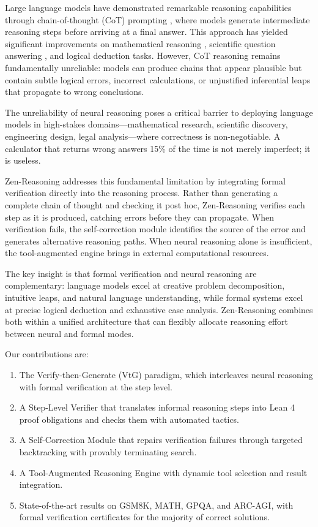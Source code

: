 \documentclass[11pt,a4paper]{article}
\begin{document}
Large language models have demonstrated remarkable reasoning capabilities through chain-of-thought (CoT) prompting \citep{wei2022chain}, where models generate intermediate reasoning steps before arriving at a final answer. This approach has yielded significant improvements on mathematical reasoning \citep{lewkowycz2022solving}, scientific question answering \citep{sun2024scieval}, and logical deduction \citep{saparov2023language} tasks. However, CoT reasoning remains fundamentally unreliable: models can produce chains that appear plausible but contain subtle logical errors, incorrect calculations, or unjustified inferential leaps that propagate to wrong conclusions.

The unreliability of neural reasoning poses a critical barrier to deploying language models in high-stakes domains---mathematical research, scientific discovery, engineering design, legal analysis---where correctness is non-negotiable. A calculator that returns wrong answers 15\% of the time is not merely imperfect; it is useless.

Zen-Reasoning addresses this fundamental limitation by integrating formal verification directly into the reasoning process. Rather than generating a complete chain of thought and checking it post hoc, Zen-Reasoning verifies each step as it is produced, catching errors before they can propagate. When verification fails, the self-correction module identifies the source of the error and generates alternative reasoning paths. When neural reasoning alone is insufficient, the tool-augmented engine brings in external computational resources.

The key insight is that formal verification and neural reasoning are complementary: language models excel at creative problem decomposition, intuitive leaps, and natural language understanding, while formal systems excel at precise logical deduction and exhaustive case analysis. Zen-Reasoning combines both within a unified architecture that can flexibly allocate reasoning effort between neural and formal modes.

Our contributions are:
\begin{enumerate}
    \item The Verify-then-Generate (VtG) paradigm, which interleaves neural reasoning with formal verification at the step level.
    \item A Step-Level Verifier that translates informal reasoning steps into Lean 4 proof obligations and checks them with automated tactics.
    \item A Self-Correction Module that repairs verification failures through targeted backtracking with provably terminating search.
    \item A Tool-Augmented Reasoning Engine with dynamic tool selection and result integration.
    \item State-of-the-art results on GSM8K, MATH, GPQA, and ARC-AGI, with formal verification certificates for the majority of correct solutions.
\end{enumerate}
\end{document}
